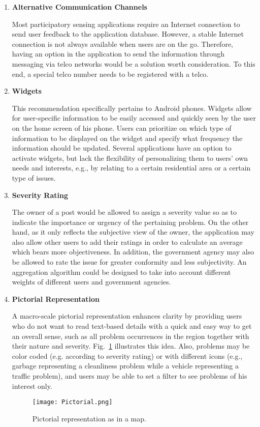 \documentclass[conference,10pt]{IEEEtran}
\begin{document}
\begin{enumerate}[leftmargin=1.5em]
\item{\textbf{Alternative Communication Channels}} \par Most participatory sensing applications require an Internet connection to send user feedback to the application database. However, a stable Internet connection is not always available when users are on the go. Therefore, having an option in the application to send the information through messaging via telco networks would be a solution worth consideration. To this end, a special telco number needs to be registered with a telco.
\item{\textbf{Widgets}} \par This recommendation specifically pertains to Android phones. Widgets allow for user-specific information to be easily accessed and quickly seen by the user on the home screen of his phone. Users can prioritize on which type of information to be displayed on the widget and specify what frequency the information should be updated. Several applications have an option to activate widgets, but lack the flexibility of personalizing them to users' own needs and interests, e.g., by relating to a certain residential area or a certain type of issues.
\item{\textbf{Severity Rating}} \par The owner of a post would be allowed to assign a severity value so as to indicate the importance or urgency of the pertaining problem. On the other hand, as it only reflects the subjective view of the owner, the application may also allow other users to add their ratings in order to calculate an average which bears more objectiveness. In addition, the government agency may also be allowed to rate the issue for greater conformity and less subjectivity. An aggregation algorithm could be designed to take into account different weights of different users and government agencies.
\item{\textbf{Pictorial Representation}} \par A macro-scale pictorial representation enhances clarity by providing users who do not want to read text-based details with a quick and easy way to get an overall sense, such as all problem occurrences in the region together with their nature and severity. Fig.~\ref{Fig:pictorial} illustrates this idea. Also, problems may be color coded (e.g. according to severity rating) or with different icons (e.g., garbage representing a cleanliness problem while a vehicle representing a traffic problem), and users may be able to set a filter to see problems of his interest only.

\begin{figure}[ht]
\begin{center}
\texttt{[image: Pictorial.png]}
\caption [Illustration of color-sensitive graph coloring] {
\label{Fig:pictorial}{Pictorial representation as in a map.}}
\end{center}
\end{figure}
\end{enumerate}
\end{document}
